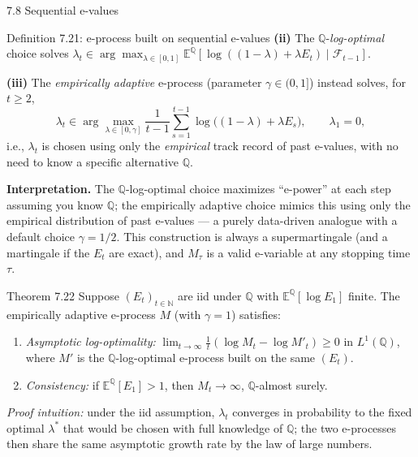 \documentclass[aspectratio=169,10pt]{beamer}
\newcommand{\Nmb}{\mathbb{N}}
\begin{document}
\begin{frame}[allowframebreaks]{7.8 Sequential e-values}
\begin{block}{Definition 7.21: e-process built on sequential e-values}
\textbf{(ii)} The $\mathbb Q$-\emph{log-optimal} choice solves
$\lambda_t \in \arg\max_{\lambda\in[0,1]} \mathbb E^{\mathbb Q}[\log((1-\lambda)+\lambda E_t)\mid \mathcal F_{t-1}]$.

\textbf{(iii)} The \emph{empirically adaptive} e-process (parameter $\gamma\in(0,1]$) instead solves, for $t\ge2$,
$$\lambda_t \in \arg\max_{\lambda\in[0,\gamma]} \frac{1}{t-1}\sum_{s=1}^{t-1}\log\big((1-\lambda)+\lambda E_s\big), \qquad \lambda_1=0,$$
i.e., $\lambda_t$ is chosen using only the \emph{empirical} track record of past e-values, with no need to know a
specific alternative $\mathbb Q$.
\end{block}

\framebreak

\textbf{Interpretation.} The $\mathbb Q$-log-optimal choice maximizes ``e-power'' at each step assuming you know
$\mathbb Q$; the empirically adaptive choice mimics this using only the empirical distribution of past e-values ---
a purely data-driven analogue with a default choice $\gamma = 1/2$. This construction is always a supermartingale
(and a martingale if the $E_t$ are exact), and $M_\tau$ is a valid e-variable at any stopping time $\tau$.

\begin{block}{Theorem 7.22}
Suppose $(E_t)_{t\in\Nmb}$ are iid under $\mathbb Q$ with $\mathbb E^{\mathbb Q}[\log E_1]$ finite. The empirically
adaptive e-process $M$ (with $\gamma=1$) satisfies:
\begin{enumerate}
\item[(i)] \emph{Asymptotic log-optimality:} $\lim_{t\to\infty}\frac1t(\log M_t - \log M'_t) \ge 0$ in
$L^1(\mathbb Q)$, where $M'$ is the $\mathbb Q$-log-optimal e-process built on the same $(E_t)$.
\item[(ii)] \emph{Consistency:} if $\mathbb E^{\mathbb Q}[E_1] > 1$, then $M_t \to \infty$, $\mathbb Q$-almost surely.
\end{enumerate}
\end{block}
\emph{Proof intuition:} under the iid assumption, $\lambda_t$ converges in probability to the fixed optimal
$\lambda^*$ that would be chosen with full knowledge of $\mathbb Q$; the two e-processes then share the same
asymptotic growth rate by the law of large numbers.

\end{frame}
\end{document}
